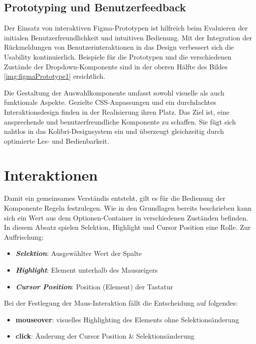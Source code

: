 \subsection{Prototyping und Benutzerfeedback}
\label{sec:userFeedbackPtototyping}

Der Einsatz von interaktiven Figma-Prototypen ist hilfreich beim Evaluieren der initialen Benutzerfreundlichkeit und intuitiven Bedienung. 
Mit der Integration der Rückmeldungen von Benutzerinteraktionen in das Design verbessert sich die Usability kontinuierlich.
Beispiele für die Prototypen und die verschiedenen Zustände der Dropdown-Komponente sind in der oberen Hälfte des Bildes \ref{img:figmaPrototype1} ersichtlich.

Die Gestaltung der Auswahlkomponente umfasst sowohl visuelle als auch funktionale Aspekte. 
Gezielte CSS-Anpassungen und ein durchdachtes Interaktionsdesign finden in der Realisierung ihren Platz. 
Das Ziel ist, eine ansprechende und benutzerfreundliche Komponente zu schaffen. 
Sie fügt sich nahtlos in das Kolibri-Designsystem ein und überzeugt gleichzeitig durch optimierte Les- und Bedienbarkeit.


\section{Interaktionen} %
\label{sec:interaction}

Damit ein gemeinsames Verständis entsteht, gilt es für die Bedienung der Komponente Regeln festzulegen.
Wie in den Grundlagen bereits beschrieben kann sich ein Wert aus dem Optionen-Container in verschiedenen Zuständen befinden.
In diesem Absatz spielen Selektion, Highlight und Cursor Position eine Rolle.
Zur Auffrischung: 

\begin{itemize}
    \item \textbf{\emph{Selektion}}: Ausgewählter Wert der Spalte
    \item \textbf{\emph{Highlight}}: Element unterhalb des Mauszeigers
    \item \textbf{\emph{Cursor Position}}: Position (Element) der Tastatur
\end{itemize}

\noindent
Bei der Festlegung der Maus-Interaktion fällt die Entscheidung auf folgendes:

\begin{itemize}
    \item \textbf{mouseover}: visuelles Highlighting des Elements ohne Selektionsänderung
    \item \textbf{click}: Änderung der Cursor Position \& Selektionsänderung
\end{itemize}

